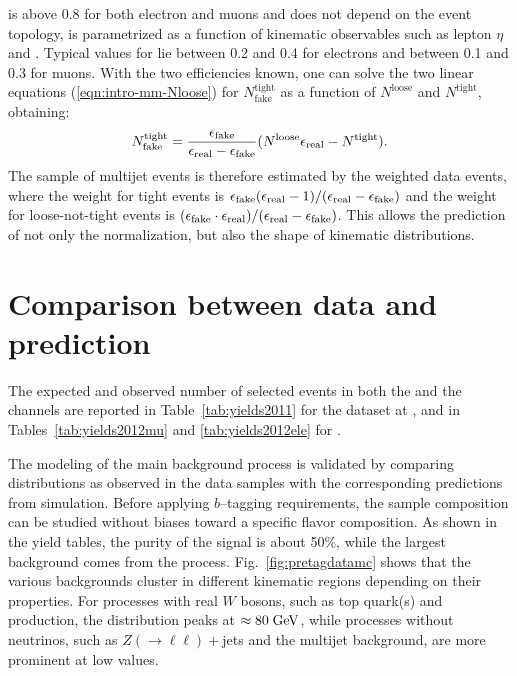 is above 0.8 for both electron and muons and does not depend on the
event topology, \effFake{} is parametrized as a function of kinematic
observables such as lepton $\eta$ and . Typical
values for \effFake{} lie between 0.2 and 0.4 for electrons and
between 0.1 and 0.3 for muons. With the two efficiencies known, one
can solve the two linear equations (\ref{eqn:intro-mm-Nloose}) for
$N^{\mathrm{tight}}_\mathrm{fake}$ as a function of $N^\mathrm{loose}$
and $N^\mathrm{tight}$, obtaining:
%                                                                                             
\begin{equation}
  N^\mathrm{tight}_\mathrm{fake}
  = \frac{\epsilon_{\mathrm{fake}}{}}
  {\epsilon_{\mathrm{real}}{} - \epsilon_{\mathrm{fake}}{}}
  (N^\mathrm{loose} \epsilon_{\mathrm{real}}{} - N^\mathrm{tight}).
  \label{eqn:intro-mm-tight_fake}
\end{equation}
%                                                                                             
The sample of multijet events is therefore estimated by the weighted
data events, where the weight for tight events is
$\epsilon_{\mathrm{fake}}{}(\epsilon_{\mathrm{real}}{}-1)/(\epsilon_{\mathrm{real}}{}-\epsilon_{\mathrm{fake}}{})$
and the weight for loose-not-tight events is
$(\epsilon_{\mathrm{fake}}{}\cdot{}\epsilon_{\mathrm{real}}{})/(\epsilon_{\mathrm{real}}{}-\epsilon_{\mathrm{fake}}{})$.
This allows the prediction of not only the normalization, but also the
shape of kinematic distributions.

\section{Comparison between data and prediction}
\label{sec:datamc}

The expected and observed number of selected events in both the
\mujets{} and the \ejets{} channels are reported in
Table~\ref{tab:yields2011} for the dataset at \seventev{}, and in
Tables~\ref{tab:yields2012mu} and \ref{tab:yields2012ele}  for \eighttev{}.



The modeling of the main background process is validated by comparing
distributions as observed in the data samples with the corresponding
predictions from simulation. 
Before applying $b$--tagging requirements, the sample composition can
be studied without biases toward a specific flavor composition. As
shown in the yield tables, the purity of the \ttbar{} signal is about
50\%, while the largest background comes from the \wjets{}
process. Fig.~\ref{fig:pretagdatamc} shows that the various
backgrounds cluster in different kinematic regions depending on their
properties. For processes with real $W$ bosons, such as top quark(s)
and \wjets{} production, the \mtw{} distribution peaks at
$\approx80\; \mathrm{GeV}{}$, while processes without neutrinos, such as
$Z(\to\ell\ell)+$jets and the multijet background, are more prominent
at low \met{} values.
 
